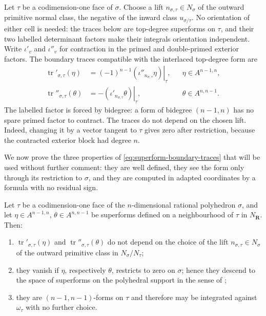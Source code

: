 Let $\tau$ be a codimension-one face of $\sigma$. Choose a lift
$n_{\sigma,\tau}\in N_\sigma$ of the outward primitive normal class, the
negative of the inward class $u_{\sigma/\tau}$.  No orientation of either
cell is needed: the traces below are top-degree superforms on $\tau$, and
their two labelled determinant factors make their integrals orientation
independent.
Write $\iota'_v$ and $\iota''_v$ for contraction in the primed and
double-primed exterior factors.  The boundary traces compatible with the
interlaced top-degree form are
\begin{equation}
\label{eq:superform-boundary-traces}
\begin{aligned}
 \operatorname{tr}'_{\sigma,\tau}(\eta)
   &=(-1)^{n-1}\left.(\iota''_{n_{\sigma,\tau}}\eta)\right|_\tau,
       &&\eta\in A^{n-1,n},\\
 \operatorname{tr}''_{\sigma,\tau}(\theta)
   &=-\left.(\iota'_{n_{\sigma,\tau}}\theta)\right|_\tau,
       &&\theta\in A^{n,n-1}.
\end{aligned}
\end{equation}
The labelled factor is forced by bidegree: a form of bidegree $(n-1,n)$
has no spare primed factor to contract.  The traces do not depend on the
chosen lift.  Indeed, changing it by a vector tangent to $\tau$ gives zero
after restriction, because the contracted exterior block had degree $n$.

We now prove the three properties of \eqref{eq:superform-boundary-traces}
that will be used without further comment: they are well defined, they see
the form only through its restriction to $\sigma$, and they are computed in
adapted coordinates by a formula with no residual sign.

\begin{lemma}
\label{lem:ch11-trace-welldefined}
Let $\tau$ be a codimension-one face of the $n$-dimensional rational
polyhedron $\sigma$, and let $\eta\in A^{n-1,n}$, $\theta\in A^{n,n-1}$ be
superforms defined on a neighbourhood of $\tau$ in $N_{\mathbf R}$.  Then:
\begin{enumerate}
\item\label{itm:ch11-trace:lift}
  $\operatorname{tr}'_{\sigma,\tau}(\eta)$ and
  $\operatorname{tr}''_{\sigma,\tau}(\theta)$ do not depend on the choice of
  the lift $n_{\sigma,\tau}\in N_\sigma$ of the outward primitive class in
  $N_\sigma/N_\tau$;
\item\label{itm:ch11-trace:restriction}
  they vanish if $\eta$, respectively $\theta$, restricts to zero on
  $\sigma$; hence they descend to the space of superforms on the polyhedral
  support in the sense of ;
\item\label{itm:ch11-trace:target}
  they are $(n-1,n-1)$-forms on $\tau$ and therefore may be integrated
  against $\omega_\tau$ with no further choice.
\end{enumerate}
\end{lemma}

